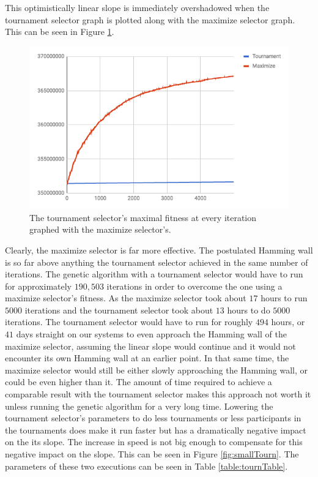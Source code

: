 This optimistically linear slope is immediately overshadowed when the tournament selector graph is plotted along with the maximize selector graph. This can be seen in Figure \ref{fig:tournamentvsmaximize}.
\begin{figure}
    \centering
    \includegraphics[width=0.65\linewidth]{TournamentvsMaximize.png}
    \caption[Tournament selector fitness graph versus maximal selector fitness graph]{The tournament selector's maximal fitness at every iteration graphed with the maximize selector's.}
    \label{fig:tournamentvsmaximize}
\end{figure}
Clearly, the maximize selector is far more effective. The postulated Hamming wall is so far above anything the tournament selector achieved in the same number of iterations. The genetic algorithm with a tournament selector would have to run for approximately $190,503$ iterations in order to overcome the one using a maximize selector's fitness. As the maximize selector took about $17$ hours to run $5000$ iterations and the tournament selector took about $13$ hours to do $5000$ iterations. The tournament selector would have to run for roughly $494$ hours, or $41$ days straight on our systems to even approach the Hamming wall of the maximize selector, assuming the linear slope would continue and it would not encounter its own Hamming wall at an earlier point. In that same time, the maximize selector would still be either slowly approaching the Hamming wall, or could be even higher than it. The amount of time required to achieve a comparable result with the tournament selector makes this approach not worth it unless running the genetic algorithm for a very long time. Lowering the tournament selector's parameters to do less tournaments or less participants in the tournaments does make it run faster but has a dramatically negative impact on the its slope. The increase in speed is not big enough to compensate for this negative impact on the slope. This can be seen in Figure \ref{fig:smallTourn}. The parameters of these two executions can be seen in Table \ref{table:tournTable}. 

